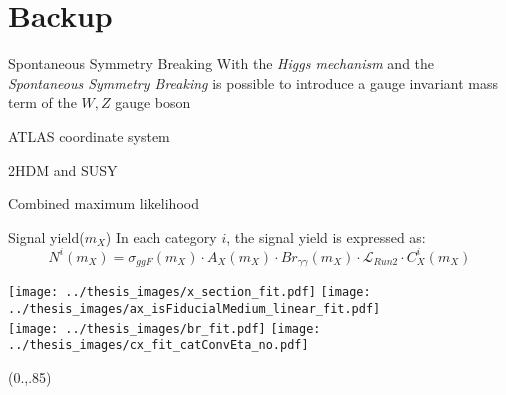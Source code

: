\documentclass[10pt,UKenglish, leqno, xcolor = dvipsnames]{beamer}
\begin{document}
	\section{Backup}
	\SectionPage
		
		\begin{frame}{Spontaneous Symmetry Breaking}
			With the \textit{Higgs mechanism} and the \textit{Spontaneous Symmetry Breaking} is possible to introduce a gauge invariant mass term of the $W,Z$ gauge boson
		\end{frame}
	
		\begin{frame}{ATLAS coordinate system}
			
		\end{frame}
	
		\begin{frame}{2HDM and SUSY}
			
		\end{frame}
		
		\begin{frame}{Combined maximum likelihood}
			
		\end{frame}
	
			\begin{frame}{Signal yield($m_X$)}
			\vfill
			In each category $i$, the signal yield is expressed as:
			$$
			N^i(m_X) = \sigma_{ggF}(m_X) \cdot A_X(m_X) \cdot Br_{\gamma\gamma}(m_X) \cdot \mathcal{L}_{Run2} \cdot C_X^i(m_X)
			$$
			\begin{center}
				\texttt{[image: ../thesis\_images/x\_section\_fit.pdf]}
				\texttt{[image: ../thesis\_images/ax\_isFiducialMedium\_linear\_fit.pdf]}\\
				\texttt{[image: ../thesis\_images/br\_fit.pdf]}			
				\texttt{[image: ../thesis\_images/cx\_fit\_catConvEta\_no.pdf]}
			\end{center}
			\vfill
			\begin{textblock}{1}(0.,.85)
				\begin{figure}
				\end{figure}
			\end{textblock}
		\end{frame}
\end{document}
